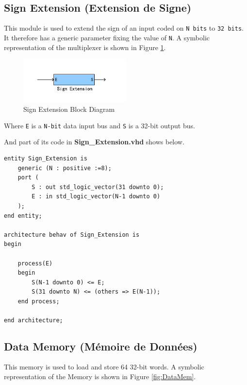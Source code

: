 
\subsection{Sign Extension (Extension de Signe)}

This module is used to extend the sign of an input coded 
on \texttt{N bits} to \texttt{32 bits}. It therefore has a generic parameter 
fixing the value of \texttt{N}. A symbolic representation 
of the multiplexer is shown in Figure \ref{fig:SignExtension}.

\begin{figure}[htp]
    \centering
    \includegraphics[width=0.5\textwidth]{picture/SignExtension.pdf}
    \caption{Sign Extension Block Diagram}     
    \label{fig:SignExtension}
\end{figure}

Where \texttt{E} is a \texttt{N-bit} data input bus and \texttt{S} is a 32-bit output bus.

And part of its code in \textbf{Sign\_Extension.vhd} shows below.

\begin{lstlisting}[style=vhdl]
entity Sign_Extension is 
    generic (N : positive :=8);
    port (			
        S : out std_logic_vector(31 downto 0);
        E : in std_logic_vector(N-1 downto 0)			
    );
end entity;
  
architecture behav of Sign_Extension is
begin
  
    process(E)
    begin 
        S(N-1 downto 0) <= E; 
        S(31 downto N) <= (others => E(N-1)); 
    end process; 
  
end architecture;
\end{lstlisting}


\subsection{Data Memory (Mémoire de Données)}

This memory is used to load and store 64 32-bit words. A symbolic representation 
of the Memory is shown in Figure \ref{fig:DataMem}.

